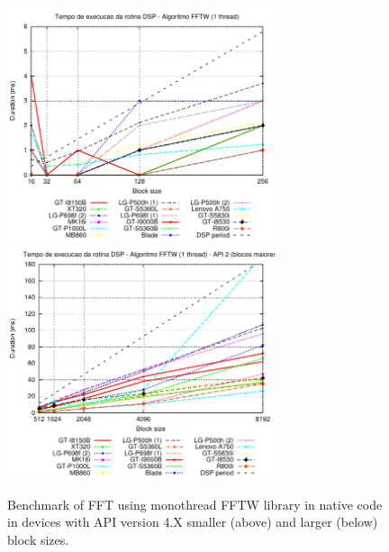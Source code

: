\documentclass[12pt]{article}
\begin{document}
\begin{figure}[h!]
\begin{center}
\includegraphics[width=0.7\textwidth]{img/FFTW_MONO-2-a.pdf}
\includegraphics[width=0.7\textwidth]{img/FFTW_MONO-2-b.pdf}
\end{center}
\caption{Benchmark of FFT using monothread FFTW library in native code in
devices with API version 4.X smaller (above) and larger (below) block sizes.}
\label{fig:alg-fftw-mono}
\end{figure}
\end{document}
